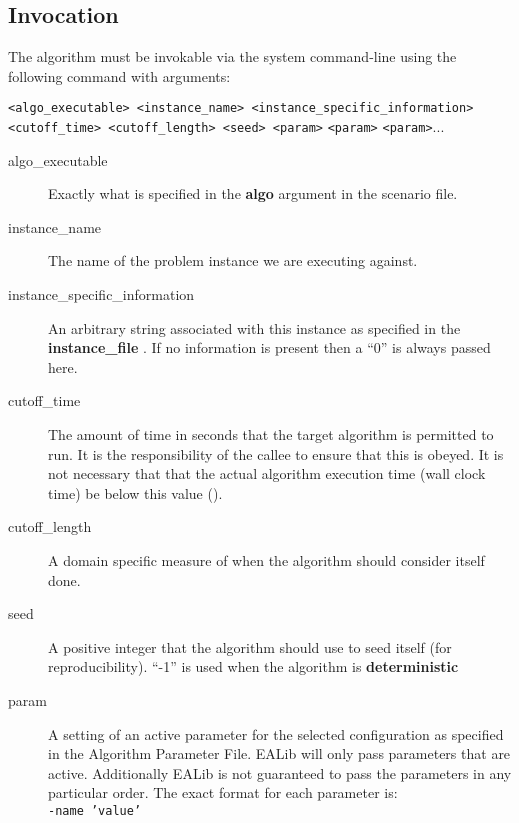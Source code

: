 \documentclass[manual.tex]{subfiles}
\begin{document}
\subsection{Invocation}

The algorithm must be invokable via the system command-line using the following command with arguments:

\texttt{<algo\_executable> <instance\_name> <instance\_specific\_information>
<cutoff\_time> <cutoff\_length> <seed> <param>} \texttt{<param>} \texttt{<param>}...

\begin{description}
\item [{algo\_executable}] Exactly what is specified in the \textbf{algo} argument in the scenario file.
 
\item [{instance\_name}] The name of the problem instance we are executing
against.

\item [{instance\_specific\_information}] An arbitrary string associated
with this instance as specified in the \textbf{instance\_file }. If
no information is present then a ``0'' is always passed here. 

\item [{cutoff\_time}] The amount of time in seconds that the target algorithm
is permitted to run. It is the responsibility of the callee
to ensure that this is obeyed. It is not necessary that that the actual
algorithm execution time (wall clock time) be below this value ().

\item [{cutoff\_length}] A domain specific measure of when the algorithm should consider itself done.

\item [{seed}] A positive integer that the algorithm should use to seed
itself (for reproducibility). ``-1'' is used when the algorithm is \textbf{deterministic}

\item [{param}] A setting of an active parameter for the selected configuration
as specified in the Algorithm Parameter File. EALib will only pass
parameters that are active. Additionally EALib is not guaranteed
to pass the parameters in any particular order. The exact format for
each parameter is:\\
\texttt{-name~'value'}

\end{description}
\end{document}

